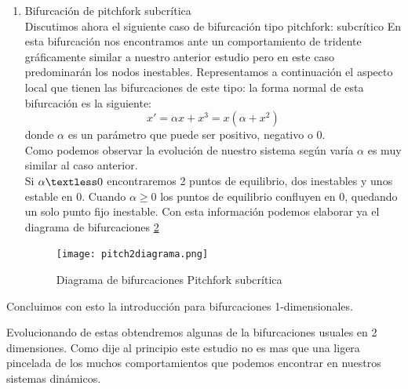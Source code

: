 \begin{enumerate}
\begin{enumerate}
	Una vez concluido este estudio podemos representar trivialmente el diagrama de bifurcaciones, del cual se puede comprender mejor la denotación de esta bifurcación (Figura \ref{pitch1}).\\
		\begin{figure}[H]
			\centering
			\texttt{[image: pitch1diagrama.png]}
			\caption{Diagrama de bifurcaciones pitchfork supercrítica.}
			\label{pitch1}
		\end{figure}
	
	\item Bifurcación de pitchfork subcrítica\\
	Discutimos ahora el siguiente caso de bifurcación tipo pitchfork: subcrítico En esta bifurcación nos encontramos ante un comportamiento de tridente gráficamente similar a nuestro anterior estudio pero en este caso predominarán los nodos inestables. Representamos a continuación el aspecto local que tienen las bifurcaciones de este tipo: 
	la forma normal de esta bifurcación es la siguiente:
	\begin{equation}
	x'=\alpha x+x^3=x(\alpha +x^2)
	\label{pitch2}
	\end{equation}
	donde $\alpha$ es un parámetro que puede ser positivo, negativo o 0.\\
	Como podemos observar la evolución de nuestro sistema según varía $\alpha$ es muy similar al caso anterior. \\Si $\alpha \textless 0$ encontraremos 2 puntos de equilibrio, dos inestables y unos estable en 0. Cuando $\alpha \geq 0$ los puntos de equilibrio confluyen en 0, quedando un solo punto fijo inestable.
	Con esta información podemos elaborar ya el diagrama de bifurcaciones \ref{pitch21}
	\begin{figure}[H]
		\centering
		\texttt{[image: pitch2diagrama.png]}
		\caption{Diagrama de bifurcaciones Pitchfork subcrítica}
		\label{pitch21}
	\end{figure}
\end{enumerate}
Concluimos con esto la introducción para bifurcaciones 1-dimensionales.


 Evolucionando de estas obtendremos algunas de la bifurcaciones usuales en 2 dimensiones. Como dije al principio este estudio no es mas que una ligera pincelada de los muchos comportamientos que podemos encontrar en nuestros sistemas dinámicos.
\end{enumerate}

